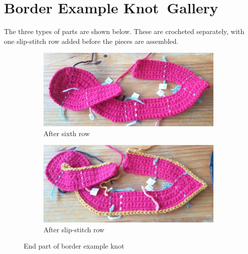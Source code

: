 \documentclass[openany]{book}
\newcommand{\bk}{border example knot}
\newcommand{\BK}{Border Example Knot}
\begin{document}
\section{\BK ~Gallery}\label{sec:gallery}
The three types of parts are shown below. These are crocheted separately, with one slip-stitch row added before the pieces are assembled.
\begin{figure}[H]\centering
\begin{subfigure}[t]{.45\textwidth}\centering
\includegraphics[width=.95\textwidth]{bk/end}
\caption{After sixth row}
\end{subfigure}
%
\begin{subfigure}[t]{.45\textwidth}
		\centering
		\includegraphics[width=.95\textwidth]{bk/end2}
\caption{After slip-stitch row}
\end{subfigure}
\caption{End part of \bk}
\end{figure}
\end{document}
